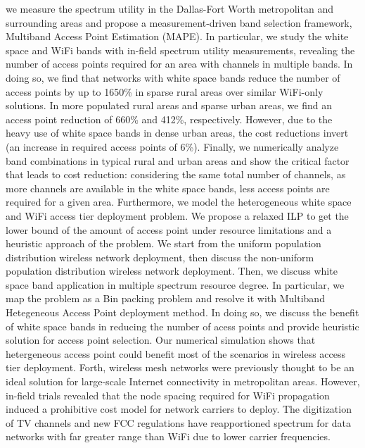 we measure the spectrum utility in the Dallas-Fort 
Worth metropolitan and surrounding
areas and propose a measurement-driven band selection framework, Multiband Access Point Estimation (MAPE). 
In particular, we study the white space and WiFi bands with in-field spectrum utility measurements, revealing 
the number of access points required for an area with channels in multiple bands. In doing so, we find that 
networks with white space bands reduce the number of access points by up to 1650\% in sparse
rural areas over similar WiFi-only solutions. In more populated rural areas and sparse urban areas, we 
find an access point reduction of 660\% and 412\%, respectively.  However, due to the heavy use of white
space bands in dense urban areas, the cost reductions invert (an increase in required access points 
of 6\%).  Finally, we numerically analyze band combinations in typical rural and urban areas and show 
the critical factor that leads to cost reduction: considering the same total number of channels, as more 
channels are available in the white space bands, less access points are required for a given area.
Furthermore, we model the heterogeneous white space and WiFi access tier 
deployment problem. We propose a relaxed ILP to get the lower bound of the 
amount of access point under resource limitations and a heuristic approach 
of the problem. We start from the uniform population distribution wireless 
network deployment, then discuss the non-uniform population distribution 
wireless network deployment. Then, we discuss white space band application
in multiple spectrum resource degree. 
In particular, we map the problem as a Bin packing problem 
and resolve it with Multiband Hetegeneous Access Point deployment method. 
In doing so, we discuss the benefit of white space bands in reducing 
the number of acess points and provide heuristic solution for access point
 selection. Our numerical simulation shows that
hetergeneous access point could benefit most of the scenarios in wireless
access tier deployment.
Forth,
wireless mesh networks were previously thought to be an ideal solution for
large-scale Internet connectivity in metropolitan areas.  However, in-field
trials revealed that the node spacing required for WiFi propagation 
induced a prohibitive cost model for network carriers to deploy. The digitization 
of TV channels and new FCC regulations have reapportioned spectrum for data 
networks with far greater range than WiFi due to lower carrier frequencies. 
